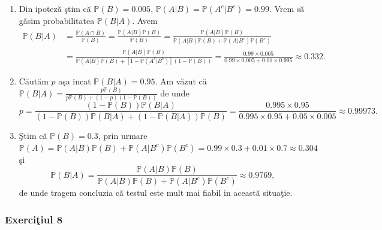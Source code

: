 \documentclass[]{article}
\def\PP{{\mathbb P}}
\begin{document}
\begin{enumerate}
    \item Din ipotez\u a \c stim c\u a $\PP(B) = 0.005$, $\PP(A|B) = \PP(A^c|B^c) = 0.99$. Vrem s\u a g\u asim probabilitatea $\PP(B|A)$. Avem
\begin{align*}
    \PP(B|A) &= \frac{\PP(A\cap B)}{\PP(B)} = \frac{\PP(A|B)\PP(B)}{\PP(B)} = \frac{\PP(A|B)\PP(B)}{\PP(A|B)\PP(B)+\PP(A|B^c)\PP(B^c)}\\
             &= \frac{\PP(A|B)\PP(B)}{\PP(A|B)\PP(B)+\left[1-\PP(A^c|B^c)\right](1-\PP(B))} = \frac{0.99\times0.005}{0.99\times0.005+0.01\times0.995} \approx 0.332.
\end{align*}
    \item C\u aut\u am $p$ a\c sa incat $\PP(B|A)=0.95$. Am v\u azut c\u a $\PP(B|A) = \frac{p\PP(B)}{p\PP(B)+(1-p)(1-\PP(B))}$ de unde
\begin{equation*}
    p = \frac{(1-\PP(B))\PP(B|A)}{(1-\PP(B))\PP(B|A)+(1-\PP(B|A))\PP(B)} = \frac{0.995\times0.95}{0.995\times0.95+0.05\times0.005}\approx0.99973.
\end{equation*}
    \item \c Stim c\u a $\PP(B)=0.3$, prin urmare $\PP(A) = \PP(A|B)\PP(B)+\PP(A|B^c)\PP(B^c) = 0.99\times0.3+0.01\times0.7\approx0.304$ \c si
\begin{equation*}
    \PP(B|A) = \frac{\PP(A|B)\PP(B)}{\PP(A|B)\PP(B)+\PP(A|B^c)\PP(B^c)}\approx 0.9769,
\end{equation*}
de unde tragem concluzia c\u a testul este mult mai fiabil in aceast\u a situa\c tie.
\end{enumerate}

\subsubsection{\texorpdfstring{Exerci\c tiul
8}{Exerciiul 8}}\label{exerciiul-8}
\end{document}
